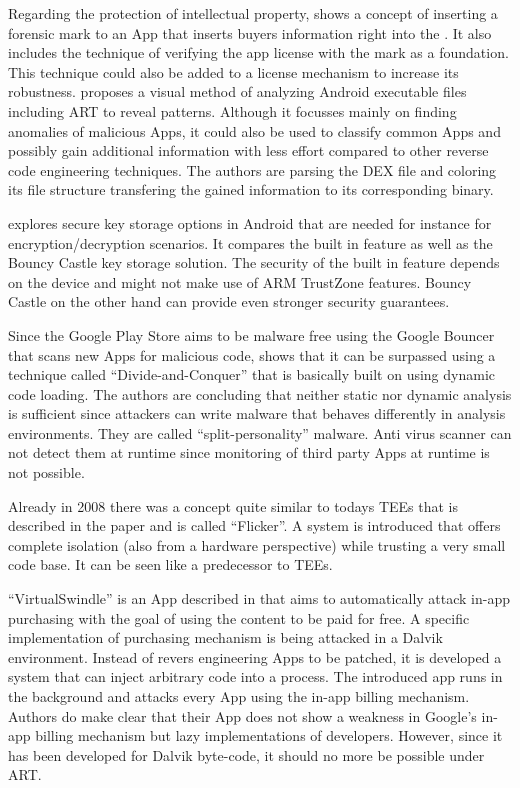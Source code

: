 Regarding the protection of intellectual property, \parencite{forensic_mark}
shows a concept of inserting a forensic mark to an App that inserts buyers
information right into the . It also includes the technique
of verifying the app license with the mark as a foundation. This technique could
also be added to a license mechanism to increase its robustness.
\parencite{visual_exploration} proposes a visual method of analyzing Android
executable files including ART to reveal patterns. Although it focusses mainly
on finding anomalies of malicious Apps, it could also be used to classify
common Apps and possibly gain additional information with less effort compared
to other reverse code engineering techniques. The authors are parsing the
DEX file and coloring its file structure transfering the gained information
to its corresponding binary.

\parencite{key_storage} explores secure key storage options in Android that are needed for instance for encryption/decryption scenarios. It compares the built in
feature as well as the Bouncy Castle key storage solution. The security of the
built in feature depends on the device and might not make use of ARM
TrustZone features. Bouncy Castle on the other hand can provide even stronger
security guarantees.

Since the Google Play Store aims to be malware free using the Google Bouncer that scans new Apps for malicious code, \parencite{divide_and_conquer}
shows that it can be surpassed using a technique called ``Divide-and-Conquer''
that is basically built on using dynamic code loading. The authors are concluding
that neither static nor dynamic analysis is sufficient since attackers can write
malware that behaves differently in analysis environments. They are called
``split-personality'' malware. Anti virus scanner can not detect them at runtime
since monitoring of third party Apps at runtime is not possible.

Already in 2008 there was a concept quite similar to todays TEEs that is described in the paper \parencite{flicker} and is called ``Flicker''.
A system is introduced that offers complete isolation (also from a hardware perspective) while trusting a very small code base. It can be seen like a predecessor to TEEs.

``VirtualSwindle'' is an App described in \parencite{virtualswindle} that
aims to automatically attack in-app purchasing with the goal of using the
content to be paid for free. A specific implementation of purchasing mechanism
is being attacked in a Dalvik environment. Instead of revers engineering Apps to be patched, it is developed a system that can inject arbitrary code into a process. The introduced app runs in the background and attacks every App using
the in-app billing mechanism. Authors do make clear that their App does not show
a weakness in Google's in-app billing mechanism but lazy implementations of developers. However, since it has been developed for Dalvik byte-code, it should no more be possible under ART.

